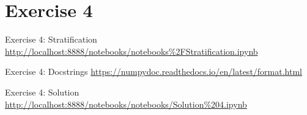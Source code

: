 \section{Exercise 4}

\begin{frame}{Exercise 4: Stratification}
    \centering
    \vfill
    \scriptsize{\url{http://localhost:8888/notebooks/notebooks\%2FStratification.ipynb}}
    \vfill
\end{frame}

\begin{frame}{Exercise 4: Docstrings}
    \centering
    \vfill
    \scriptsize{\url{
        https://numpydoc.readthedocs.io/en/latest/format.html}}
    \vfill
\end{frame}

\begin{frame}{Exercise 4: Solution}
    \centering
    \vfill
    \scriptsize{\url{http://localhost:8888/notebooks/notebooks/Solution\%204.ipynb}}
    \vfill
\end{frame}

